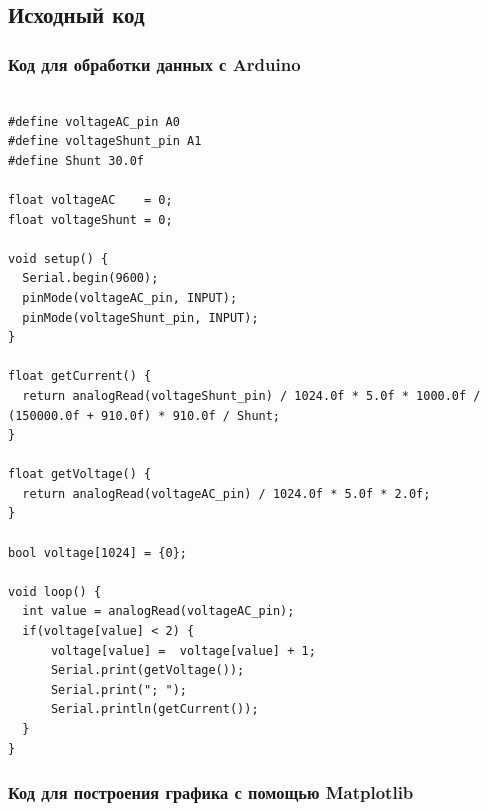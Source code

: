 \newpage
\subsection{Исходный код}

\vspace{15pt}

\subsubsection{Код для обработки данных с Arduino} \label{code_arduino}

\begin{lstlisting}

#define voltageAC_pin A0
#define voltageShunt_pin A1
#define Shunt 30.0f

float voltageAC    = 0;
float voltageShunt = 0;

void setup() {
  Serial.begin(9600);
  pinMode(voltageAC_pin, INPUT);
  pinMode(voltageShunt_pin, INPUT);
}

float getCurrent() {
  return analogRead(voltageShunt_pin) / 1024.0f * 5.0f * 1000.0f / (150000.0f + 910.0f) * 910.0f / Shunt;
}

float getVoltage() {
  return analogRead(voltageAC_pin) / 1024.0f * 5.0f * 2.0f;
}

bool voltage[1024] = {0};

void loop() {
  int value = analogRead(voltageAC_pin);
  if(voltage[value] < 2) {
      voltage[value] =  voltage[value] + 1;
      Serial.print(getVoltage());
      Serial.print("; ");
      Serial.println(getCurrent());
  }
}

\end{lstlisting}

\newpage
\subsubsection{Код для построения графика с помощью Matplotlib} \label{code_python}

